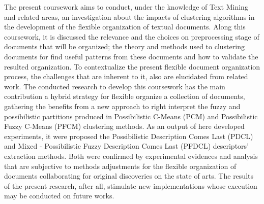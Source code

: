 The present coursework aims to conduct, under the knowledge of Text Mining and related areas, an
investigation about the impacts of clustering algorithms in the development of the flexible
organization of textual documents. Along this coursework, it is discussed the
relevance and the choices on  preprocessing stage of documents that will be organized; the theory
and methods used to clustering documents for find useful patterns from these documents and how to
validate the resulted organization. To contextualize the present flexible document organization process,
the challenges that are inherent to it, also are elucidated from related work. 
The conducted research to develop this coursework has the main contribution a hybrid  strategy for
flexible organize a collection of documents, gathering the benefits from a new approach to right
interpret the fuzzy and possibilistic partitions produced in Possibilistic C-Means (PCM) and
Possibilistic Fuzzy C-Means (PFCM) clustering methods.
As an output of here developed experiments, it were proposed the Possibilistic Description Comes
Last (PDCL) and Mixed - Possibilistic Fuzzy Description Comes Last (PFDCL) descriptors' extraction
methods.  Both were confirmed by experimental evidences and analysis that are subjective to methods
adjustments for the flexible organization of documents collaborating for original discoveries on the
state of arts. The results of the present research, after all, stimulate new implementations whose
execution may be conducted on future works.
